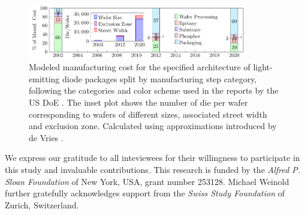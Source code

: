 \documentclass[a4paper,nocompress]{spie}  %
\begin{document}
\begin{figure} [ht]
    \begin{center}
        \includegraphics[width=0.85\textwidth]{SPIE/article/costmodel_calibration.pdf}
    \end{center}
    \caption{Modeled manufacturing cost for the specified architecture of light-emitting diode packages split by manufacturing step category, following the categories and color scheme used in the reports by the US DoE \cite{doe2016solid}. The inset plot shows the number of die per wafer corresponding to wafers of different sizes, associated street width and exclusion zone. Calculated using approximations introduced by de Vries \cite{deVries2005}.}
    \label{fig:cost}
\end{figure}


\acknowledgments %

We express our gratitude to all inteviewees for their willingness to participate in this study and invaluable contributions. This research is funded by the \textit{Alfred P. Sloan Foundation} of New York, USA, grant number 253128. Michael Weinold further gratefully acknowledges support from the \textit{Swiss Study Foundation} of Zurich, Switzerland.


\clearpage
\end{document}

